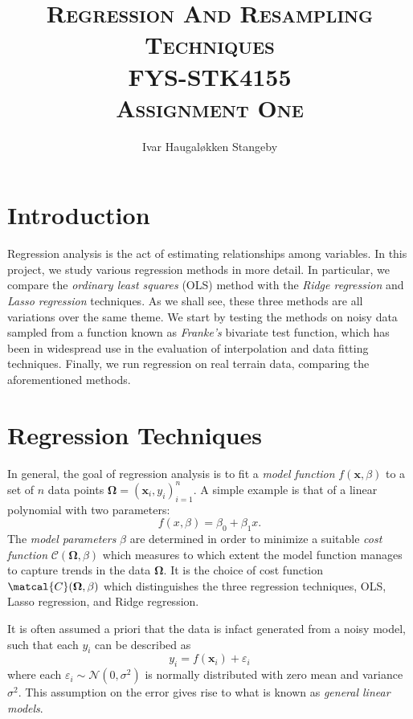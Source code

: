 \documentclass[article, a4paper, oneside, 12pt]{memoir}
\title{\textsc{Regression And Resampling Techniques \\
  FYS-STK4155 \\
Assignment One}}
\author{Ivar Haugal{\o}kken Stangeby}
\newcommand{\x}{\bm{x}}
\newcommand{\data}{\bm{\Omega}}
\newcommand{\cost}{\mathcal{C}}
\newcommand{\N}{\mathcal{N}}
\begin{document}
  \maketitle 

  \chapter{Introduction}
  
  Regression analysis is the act of estimating relationships among variables.
  In this project, we study various regression methods in more detail. In
  particular, we compare the \emph{ordinary least squares} (OLS) method with
  the \emph{Ridge regression} and \emph{Lasso regression} techniques. As we
  shall see, these three methods are all variations over the same theme. We
  start by testing the methods on noisy data sampled from a function known as
  \emph{Franke's} bivariate test function, which has been in widespread use in
  the evaluation of interpolation and data fitting techniques. Finally, we run
  regression on real terrain data, comparing the aforementioned methods.

  \chapter{Regression Techniques}

  In general, the goal of regression analysis is to fit a \emph{model function}
  \( f(\x, \beta) \) to a set of \( n \) data points \( \data = (\x_i,
  y_i)_{i=1}^n \). A simple example is that of a linear polynomial with two
  parameters:
  \begin{equation}
    f(x, \beta) = \beta_0 + \beta_1 x.
  \end{equation}
  The \emph{model parameters} \( \beta \) are determined in order to minimize a
  suitable \emph{cost function} \(\cost(\data, \beta)\) which measures to which
  extent the model function manages to capture trends in the data \( \data \).
  It is the choice of cost function \( \matcal{C}(\data, \beta)\) which
  distinguishes  the three regression techniques, OLS, Lasso regression, and
  Ridge regression.

  \begin{remark}
    It is often assumed a priori that the data is infact generated from a noisy
    model, such that each \( y_i \) can be described as
    \begin{equation}
      y_i = f(\x_i) + \varepsilon_i
    \end{equation}
    where each \( \varepsilon_i \sim \N(0, \sigma^2) \) is normally distributed
    with zero mean and variance \( \sigma^2 \). This assumption on the error
    gives rise to what is known as \emph{general linear models}.
  \end{remark}
\end{document}

